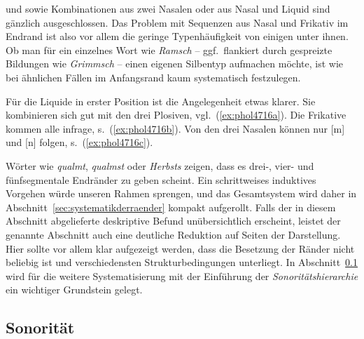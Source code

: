 \textipa{[mf]} und \textipa{[Nf]} sowie Kombinationen aus zwei Nasalen oder aus Nasal und Liquid sind gänzlich ausgeschlossen.
Das Problem mit Sequenzen aus Nasal und Frikativ im Endrand ist also vor allem die geringe Typenhäufigkeit von einigen unter ihnen.
Ob man \zB für ein einzelnes Wort wie \textit{Ramsch} -- ggf.\ flankiert durch gespreizte Bildungen wie \textit{Grimmsch} -- einen eigenen Silbentyp aufmachen möchte, ist wie bei ähnlichen Fällen im Anfangsrand kaum systematisch festzulegen.

Für die Liquide in erster Position ist die Angelegenheit etwas klarer.
Sie kombinieren sich gut mit den drei Plosiven, vgl.\ (\ref{ex:phol4716a}).
Die Frikative kommen alle infrage, s.\ (\ref{ex:phol4716b}).
Von den drei Nasalen können nur [m] und [n] folgen, s.\ (\ref{ex:phol4716c}).

\begin{exe}
  \ex\label{ex:phol4716}
  \begin{xlist}
  \end{xlist}
\end{exe}

Wörter wie \textit{qualmt}, \textit{qualmst} oder \textit{Herbsts} zeigen, dass es drei-, vier- und fünfsegmentale Endränder zu geben scheint.
Ein schrittweises induktives Vorgehen würde unseren Rahmen sprengen, und das Gesamtsystem wird daher in Abschnitt~\ref{sec:systematikderraender} kompakt aufgerollt.
Falls der in diesem Abschnitt abgelieferte deskriptive Befund unübersichtlich erscheint, leistet der genannte Abschnitt auch eine deutliche Reduktion auf Seiten der Darstellung.
Hier sollte vor allem klar aufgezeigt werden, dass die Besetzung der Ränder nicht beliebig ist und verschiedensten Strukturbedingungen unterliegt.
In Abschnitt~\ref{sec:sonoritaet} wird für die weitere Systematisierung mit der Einführung der \textit{Sonoritätshierarchie} ein wichtiger Grundstein gelegt.


\subsection{Sonorität}

\label{sec:sonoritaet}

